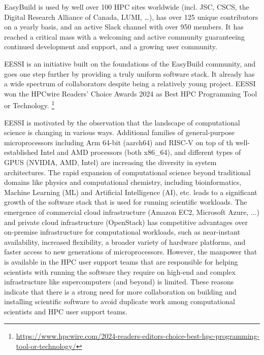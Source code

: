EasyBuild is used by well over 100 HPC sites worldwide (incl. JSC, CSCS, the Digital Research Alliance of Canada, LUMI,
\ldots),
has over 125 unique contributors on a yearly basis,
and an active Slack channel with over 950 members.
It has reached a critical mass with a welcoming and active community guaranteeing continued development and support, and
a growing user community.

EESSI is an initiative built on the foundations of the EasyBuild community, and goes one step further by providing a
truly uniform software stack. It already has a wide spectrum of collaborators despite being a relatively young project. EESSI won the HPCwire Readers’ Choice Awards 2024 as Best HPC Programming Tool or Technology. \footnote{\href{https://www.hpcwire.com/2024-readers-editors-choice-best-hpc-programming-tool-or-technology/}{https://www.hpcwire.com/2024-readers-editors-choice-best-hpc-programming-tool-or-technology/}}

EESSI is motivated by the observation that the landscape of computational science is changing in various ways.
Additional families of general-purpose microprocessors including Arm 64-bit (aarch64) and RISC-V on top of th
well-established Intel and AMD processors (both x86\_64), and different types of GPUS (NVIDIA, AMD, Intel) are
increasing the diversity in system architectures. The rapid expansion of computational science beyond traditional
domains like physics and computational chemistry, including bioinformatics, Machine Learning (ML) and Artificial
Intelligence (AI), etc. leads to a significant growth of the software stack that is used for running scientific
workloads. The emergence of commercial cloud infrastructure (Amazon EC2, Microsoft Azure, ...) and private cloud
infrastructure (OpenStack) has competitive advantages over on-premise infrastructure for computational workloads, such
as near-instant availability, increased flexibility, a broader variety of hardware platforms, and faster access to new
generations of microprocessors. However, the manpower that is available in the HPC user support teams that are
responsible for helping scientists with running the software they require on high-end and complex infrastructure like
supercomputers (and beyond) is limited. These reasons indicate that there is a strong need for more collaboration on
building and installing scientific software to avoid duplicate work among computational scientists and HPC user support
teams.

